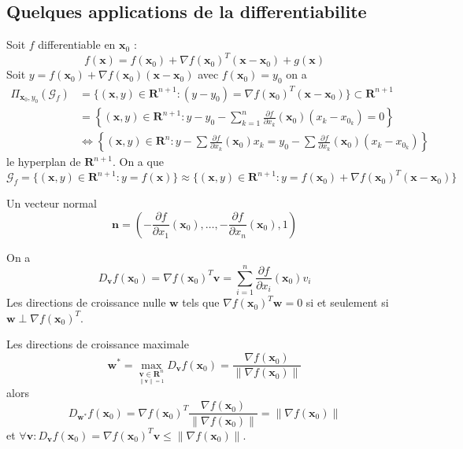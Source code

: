 \subsection*{Quelques applications de la differentiabilite}

Soit $f$ differentiable en $\boldsymbol{x}_{0}$ :
$$
f(\boldsymbol{x})=f(\boldsymbol{x}_{0})+\nabla f(\boldsymbol{x}_{0})^{T}(\boldsymbol{x}-\boldsymbol{x}_{0})+g(\boldsymbol{x})
$$
Soit $y=f(\boldsymbol{x}_{0})+\nabla f(\boldsymbol{x}_{0})(\boldsymbol{x}-\boldsymbol{x}_{0})$ avec $f(\boldsymbol{x}_{0})=y_{0}$ on a 
\begin{align*}
\Pi_{\boldsymbol{x}_{0},y_{0}}(\mathcal{G}_{f}) & =\{ (\boldsymbol{x},y)\in \mathbf{R}^{n+1}:(y-y_{0})=\nabla f(\boldsymbol{x}_{0})^{T}(\boldsymbol{x}-\boldsymbol{x}_{0}) \}\subset \mathbf{R}^{n+1} \\
 & = \left\{  (\boldsymbol{x},y)\in \mathbf{R}^{n+1}:y-y_{0}-\sum_{k=1}^{n}  \frac{ \partial f }{ \partial x_{k} } (\boldsymbol{x}_{0})(x_{k}-x_{0_{k}})=0  \right\} \\
 & \Leftrightarrow \left\{  (\boldsymbol{x},y)\in \mathbf{R}^{n}: y -\sum \frac{ \partial f }{ \partial x_{k} } (\boldsymbol{x}_{0})x_{k}=y_{0}-\sum \frac{ \partial f }{ \partial x_{k} } (\boldsymbol{x}_{0})(x_{k}-x_{0_{k}})  \right\} 
\end{align*}
le hyperplan de $\mathbf{R}^{n+1}$. On a que 
$$
\mathcal{G}_{f}=\{ (\boldsymbol{x},y)\in \mathbf{R}^{n+1}:y=f(\boldsymbol{x}) \} \approx \{ (\boldsymbol{x},y)\in \mathbf{R}^{n+1}:y=f(\boldsymbol{x}_{0})+\nabla f(\boldsymbol{x}_{0})^{T}(\boldsymbol{x}-\boldsymbol{x}_{0}) \}
$$

Un vecteur normal
$$
\boldsymbol{n}=\left( -\frac{ \partial f }{ \partial x_{1} } (\boldsymbol{x}_{0}),\dots,-\frac{ \partial f }{ \partial x_{n} } (\boldsymbol{x}_{0}),1 \right)
$$

On a
$$
D_{\boldsymbol{v}}f(\boldsymbol{x}_{0})=\nabla f(\boldsymbol{x}_{0})^{T}\boldsymbol{v}=\sum_{i=1}^{n} \frac{ \partial f }{ \partial x_{i} } (\boldsymbol{x}_{0})v_{i}
$$
Les directions de croissance nulle $\boldsymbol{w}$ tels que $\nabla f(\boldsymbol{x}_{0})^{T}\boldsymbol{w}=0$ si et seulement si $\boldsymbol{w} \perp \nabla f(\boldsymbol{x}_{0})^{T}$.

Les directions de croissance maximale 
$$
\boldsymbol{w}^{*}=\max_{\underset{\lVert \boldsymbol{v} \rVert =1}{\boldsymbol{v}\in \mathbf{R}^{n}}} D_{\boldsymbol{v}}f(\boldsymbol{x}_{0})=\frac{\nabla f(\boldsymbol{x}_{0})}{\lVert \nabla f(\boldsymbol{x}_{0}) \rVert }
$$
alors
$$
D_{\boldsymbol{w}^{*}}f(\boldsymbol{x}_{0})=\nabla f(\boldsymbol{x}_{0})^{T} \frac{\nabla f(\boldsymbol{x}_{0})}{\lVert \nabla f(\boldsymbol{x}_{0}) \rVert }=\lVert \nabla f(\boldsymbol{x}_{0}) \rVert
$$
et $\forall \boldsymbol{v}:D_{\boldsymbol{v}}f(\boldsymbol{x}_{0})=\nabla f(\boldsymbol{x}_{0})^{T}\boldsymbol{v}\le\lVert \nabla f(\boldsymbol{x}_{0}) \rVert$.

